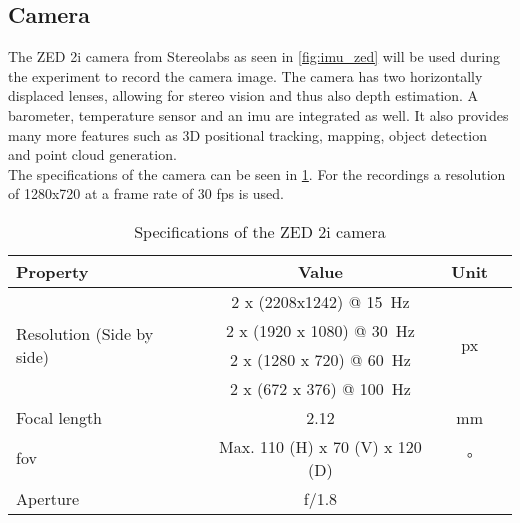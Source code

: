 \subsection{Camera}
\label{ssec:camera}
The ZED 2i camera from Stereolabs as seen in \cref{fig:imu_zed} will be used during the experiment to record the camera image.
The camera has two horizontally displaced lenses, allowing for stereo vision and thus also depth estimation.
A barometer, temperature sensor and an \gls{imu} are integrated as well.
It also provides many more features such as 3D positional tracking, mapping, object detection and point cloud generation.\\
The specifications of the camera can be seen in \cref{tab:camera_datasheet}.
For the recordings a resolution of 1280x720 at a frame rate of 30 fps is used.
\begin{table}[ht]
	\centering
	\caption{Specifications of the ZED 2i camera \cite{Stereolabs2019}}
	\label{tab:camera_datasheet}
	\begin{tabular}[t]{lccc}
		\toprule
		\textbf{Property}                          & \textbf{Value}                       & \textbf{Unit}       \\
		\midrule
		\multirow{4}{*}{Resolution (Side by side)} & 2 x (2208x1242)    @ \SI{15}{\hertz} & \multirow{4}{*}{px} \\
		                                           & 2 x (1920 x 1080) @ \SI{30}{\hertz}  &                     \\
		                                           & 2 x (1280 x 720) @ \SI{60}{\hertz}   &                     \\
		                                           & 2 x (672 x 376)   @ \SI{100}{\hertz} &                     \\
		Focal length                               & 2.12                                 & \si{\milli\metre}   \\
		\gls{fov}                                  & Max. 110 (H) x 70 (V) x 120 (D)      & \si{\degree}        \\
		Aperture                                   & f/1.8                                &                     \\
		
		\bottomrule
	\end{tabular}
\end{table}


